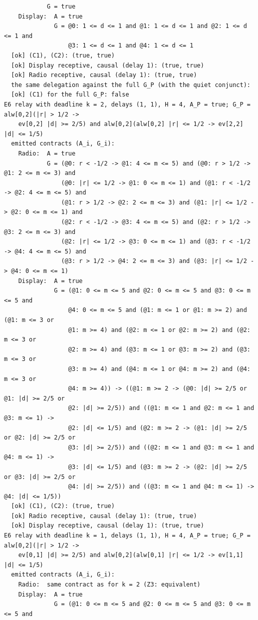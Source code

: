 \documentclass[11pt]{article}
\theoremstyle{definition}
\theoremstyle{remark}
\begin{document}
{\begin{verbatim}
            G = true
    Display:  A = true
              G = @0: 1 <= d <= 1 and @1: 1 <= d <= 1 and @2: 1 <= d <= 1 and
                  @3: 1 <= d <= 1 and @4: 1 <= d <= 1
  [ok] (C1), (C2): (true, true)
  [ok] Display receptive, causal (delay 1): (true, true)
  [ok] Radio receptive, causal (delay 1): (true, true)
  the same delegation against the full G_P (with the quiet conjunct):
  [ok] (C1) for the full G_P: false
E6 relay with deadline k = 2, delays (1, 1), H = 4, A_P = true; G_P = alw[0,2](|r| > 1/2 ->
    ev[0,2] |d| >= 2/5) and alw[0,2](alw[0,2] |r| <= 1/2 -> ev[2,2] |d| <= 1/5)
  emitted contracts (A_i, G_i):
    Radio:  A = true
            G = (@0: r < -1/2 -> @1: 4 <= m <= 5) and (@0: r > 1/2 -> @1: 2 <= m <= 3) and
                (@0: |r| <= 1/2 -> @1: 0 <= m <= 1) and (@1: r < -1/2 -> @2: 4 <= m <= 5) and
                (@1: r > 1/2 -> @2: 2 <= m <= 3) and (@1: |r| <= 1/2 -> @2: 0 <= m <= 1) and
                (@2: r < -1/2 -> @3: 4 <= m <= 5) and (@2: r > 1/2 -> @3: 2 <= m <= 3) and
                (@2: |r| <= 1/2 -> @3: 0 <= m <= 1) and (@3: r < -1/2 -> @4: 4 <= m <= 5) and
                (@3: r > 1/2 -> @4: 2 <= m <= 3) and (@3: |r| <= 1/2 -> @4: 0 <= m <= 1)
    Display:  A = true
              G = (@1: 0 <= m <= 5 and @2: 0 <= m <= 5 and @3: 0 <= m <= 5 and
                  @4: 0 <= m <= 5 and (@1: m <= 1 or @1: m >= 2) and (@1: m <= 3 or
                  @1: m >= 4) and (@2: m <= 1 or @2: m >= 2) and (@2: m <= 3 or
                  @2: m >= 4) and (@3: m <= 1 or @3: m >= 2) and (@3: m <= 3 or
                  @3: m >= 4) and (@4: m <= 1 or @4: m >= 2) and (@4: m <= 3 or
                  @4: m >= 4)) -> ((@1: m >= 2 -> (@0: |d| >= 2/5 or @1: |d| >= 2/5 or
                  @2: |d| >= 2/5)) and ((@1: m <= 1 and @2: m <= 1 and @3: m <= 1) ->
                  @2: |d| <= 1/5) and (@2: m >= 2 -> (@1: |d| >= 2/5 or @2: |d| >= 2/5 or
                  @3: |d| >= 2/5)) and ((@2: m <= 1 and @3: m <= 1 and @4: m <= 1) ->
                  @3: |d| <= 1/5) and (@3: m >= 2 -> (@2: |d| >= 2/5 or @3: |d| >= 2/5 or
                  @4: |d| >= 2/5)) and ((@3: m <= 1 and @4: m <= 1) -> @4: |d| <= 1/5))
  [ok] (C1), (C2): (true, true)
  [ok] Radio receptive, causal (delay 1): (true, true)
  [ok] Display receptive, causal (delay 1): (true, true)
E6 relay with deadline k = 1, delays (1, 1), H = 4, A_P = true; G_P = alw[0,2](|r| > 1/2 ->
    ev[0,1] |d| >= 2/5) and alw[0,2](alw[0,1] |r| <= 1/2 -> ev[1,1] |d| <= 1/5)
  emitted contracts (A_i, G_i):
    Radio:  same contract as for k = 2 (Z3: equivalent)
    Display:  A = true
              G = (@1: 0 <= m <= 5 and @2: 0 <= m <= 5 and @3: 0 <= m <= 5 and

\end{verbatim}}
\end{document}
